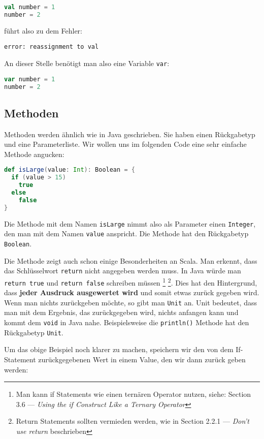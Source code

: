 \begin{lstlisting}[language=Scala,numbers=none]
val number = 1
number = 2
\end{lstlisting}

führt also zu dem Fehler:
\begin{verbatim}
error: reassignment to val
\end{verbatim}

An dieser Stelle benötigt man also eine Variable \texttt{var}:

\begin{lstlisting}[language=Scala,numbers=none]
var number = 1
number = 2
\end{lstlisting}

\subsection{Methoden}
Methoden werden ähnlich wie in Java geschrieben. Sie haben einen Rückgabetyp und eine Parameterliste. Wir wollen uns im folgenden Code eine sehr einfache Methode angucken:

\begin{lstlisting}[language=Scala]
def isLarge(value: Int): Boolean = {
  if (value > 15)
    true
  else
    false
}
\end{lstlisting}

Die Methode mit dem Namen \texttt{isLarge} nimmt also als Parameter einen \texttt{Integer}, den man mit dem Namen \texttt{value} anspricht. Die Methode hat den Rückgabetyp \texttt{Boolean}.

Die Methode zeigt auch schon einige Besonderheiten an Scala. Man erkennt, dass das Schlüsselwort \texttt{return} nicht angegeben werden muss. In Java würde man \texttt{return true} und \texttt{return false} schreiben müssen \footnote{Man kann if Statements wie einen ternären Operator nutzen, siehe: \cite{ScalaCookbook} Section 3.6 --- \textit{Using the if Construct Like a Ternary Operator}} \footnote{Return Statements sollten vermieden werden, wie in \cite{ScalaInDepth} Section 2.2.1 --- \textit{Don't use return} beschrieben}. Dies hat den Hintergrund, dass \textbf{jeder Ausdruck ausgewertet wird} und somit etwas zurück gegeben wird. Wenn man nichts zurückgeben möchte, so gibt man \texttt{Unit} an. Unit bedeutet, dass man mit dem Ergebnis, das zurückgegeben wird, nichts anfangen kann und kommt dem \texttt{void} in Java nahe. Beispielsweise die \texttt{println()} Methode hat den Rückgabetyp \texttt{Unit}.

Um das obige Beispiel noch klarer zu machen, speichern wir den von dem If-Statement zurückgegebenen Wert in einem Value, den wir dann zurück geben werden:

